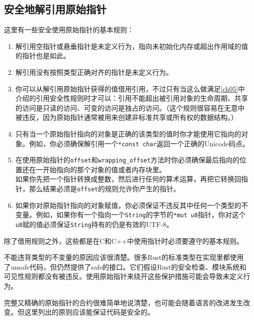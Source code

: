 \subsection{安全地解引用原始指针}\label{DerefRawP}
这里有一些安全使用原始指针的基本规则：
\begin{enumerate}
    \item 解引用空指针或悬垂指针是未定义行为，指向未初始化内存或超出作用域的值的指针也是如此。
    \item 解引用没有按照类型正确对齐的指针是未定义行为。
    \item 你可以从解引用原始指针获得的值借用引用，不过只有当这么做满足\autoref{ch05}中介绍的引用安全性规则时才可以：引用不能超出被引用对象的生命周期、共享的访问是只读的访问、可变的访问是独占的访问。（这个规则很容易在无意中被违反，因为原始指针通常被用来创建非标准共享或所有权的数据结构。）
    \item 只有当一个原始指针指向的对象是正确的该类型的值时你才能使用它指向的对象。例如，你必须确保解引用一个\texttt{*const char}返回一个正确的Unicode码点。
    \item 在使用原始指针的\texttt{offset}和\texttt{wrapping\_offset}方法时你必须确保最后指向的位置还在一开始指向的那个对象的值或者内存块里。\\ 如果你先把一个指针转换成整数，然后进行任何的算术运算，再把它转换回指针，那么结果必须是\texttt{offset}的规则允许你产生的指针。
    \item 如果你对原始指针指向的对象赋值，你必须保证不违反其中任何一个类型的不变量。例如，如果你有一个指向一个\texttt{String}的字节的\texttt{*mut u8}指针，你对这个\texttt{u8}赋的值必须保证\texttt{String}持有的仍是有效的UTF-8。
\end{enumerate}

除了借用规则之外，这些都是在C和C++中使用指针时必须要遵守的基本规则。

不能违背类型的不变量的原因应该很清楚。很多Rust的标准类型在实现里都使用了unsafe代码，但仍然提供了safe的接口。它们假设Rust的安全检查、模块系统和可见性规则都没有被违反。使用原始指针来绕开这些保护措施可能会导致未定义行为。

完整又精确的原始指针的合约很难简单地说清楚，也可能会随着语言的改进发生改变。但这里列出的原则应该能保证代码是安全的。

